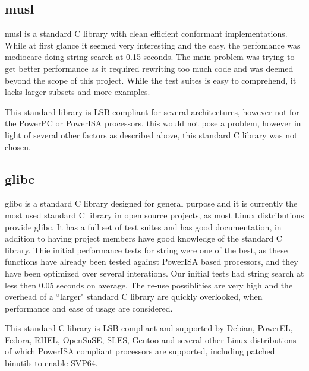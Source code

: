 \subsection{musl}
\label{content:musl}

musl is a standard C library with clean efficient conformant implementations.
While at first glance it seemed very interesting and the easy, the perfomance was mediocare doing string search at 0.15 seconds.
The main problem was trying to get better performance as it required rewriting too much code and was deemed beyond the scope of this project.
While the test suites is easy to comprehend, it lacks larger subsets and more examples.
\par

This standard library is \acrshort{LSB} compliant for several architectures, however not for the PowerPC or PowerISA processors,
this would not pose a problem, however in light of several other factors as described above, this standard C library was not chosen.
\par

\subsection{glibc}
\label{content:glibc}

glibc is a standard C library designed for general purpose and it is currently the most used standard C library in open source projects,
as most Linux distributions provide glibc.
It has a full set of test suites and has good documentation, in addition to having project members have good knowledge of the standard C library.
Thie initial performance tests for string were one of the best, as these functions have already been tested against PowerISA based processors,
and they have been optimized over several interations.
Our initial tests had string search at less then 0.05 seconds on average.
The re-use possiblities are very high and the overhead of a ``larger" standard C library are quickly overlooked,
when performance and ease of usage are considered.
\par

This standard C library is \acrshort{LSB} compliant and supported by Debian, PowerEL, Fedora, RHEL, OpenSuSE, SLES, Gentoo
and several other Linux distributions of which PowerISA compliant processors are supported, including patched binutils to enable SVP64.
\par

